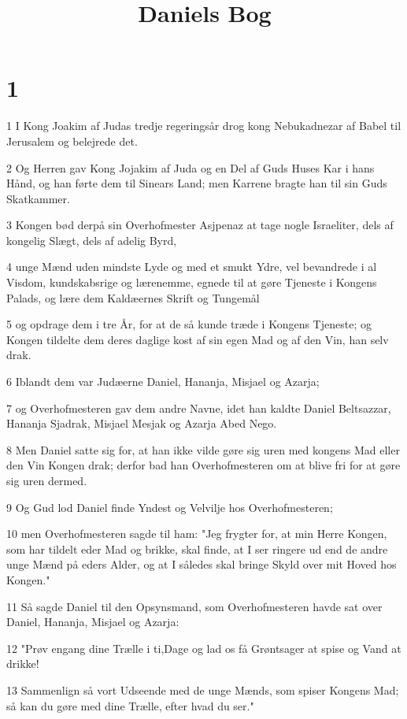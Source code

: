 

\title{Daniels Bog}


\chapter{1}

\par 1 I Kong Joakim af Judas tredje regeringsår drog kong Nebukadnezar af Babel til Jerusalem og belejrede det.
\par 2 Og Herren gav Kong Jojakim af Juda og en Del af Guds Huses Kar i hans Hånd, og han førte dem til Sinears Land; men Karrene bragte han til sin Guds Skatkammer.
\par 3 Kongen bød derpå sin Overhofmester Asjpenaz at tage nogle Israeliter, dels af kongelig Slægt, dels af adelig Byrd,
\par 4 unge Mænd uden mindste Lyde og med et smukt Ydre, vel bevandrede i al Visdom, kundskabsrige og lærenemme, egnede til at gøre Tjeneste i Kongens Palads, og lære dem Kaldæernes Skrift og Tungemål
\par 5 og opdrage dem i tre År, for at de så kunde træde i Kongens Tjeneste; og Kongen tildelte dem deres daglige kost af sin egen Mad og af den Vin, han selv drak.
\par 6 Iblandt dem var Judæerne Daniel, Hananja, Misjael og Azarja;
\par 7 og Overhofmesteren gav dem andre Navne, idet han kaldte Daniel Beltsazzar, Hananja Sjadrak, Misjael Mesjak og Azarja Abed Nego.
\par 8 Men Daniel satte sig for, at han ikke vilde gøre sig uren med kongens Mad eller den Vin Kongen drak; derfor bad han Overhofmesteren om at blive fri for at gøre sig uren dermed.
\par 9 Og Gud lod Daniel finde Yndest og Velvilje hos Overhofmesteren;
\par 10 men Overhofmesteren sagde til ham: "Jeg frygter for, at min Herre Kongen, som har tildelt eder Mad og brikke, skal finde, at I ser ringere ud end de andre unge Mænd på eders Alder, og at I således skal bringe Skyld over mit Hoved hos Kongen."
\par 11 Så sagde Daniel til den Opsynsmand, som Overhofmesteren havde sat over Daniel, Hananja, Misjael og Azarja:
\par 12 "Prøv engang dine Trælle i ti,Dage og lad os få Grøntsager at spise og Vand at drikke!
\par 13 Sammenlign så vort Udseende med de unge Mænds, som spiser Kongens Mad; så kan du gøre med dine Trælle, efter hvad du ser."
